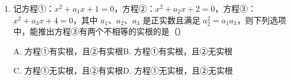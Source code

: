 \documentclass[a4paper,11pt]{article}
\begin{document}
\begin{enumerate}
C. 对 $(a,b,c)$ 的任意值，$a+\dfrac1b$、$b+\dfrac1c$、$c+\dfrac1a$ 都不小于 $2$

D. 对 $(a,b,c)$ 的任意值，$a+\dfrac1b$、$b+\dfrac1c$、$c+\dfrac1a$ 中至多有两个不小于 $2$

\ifanswer
\solbegin
{}
\solend

\fi

\item 记方程①：$x^2+a_1x+1=0$，方程②：$x^2+a_2x+2=0$，方程③：$x^2+a_3x+4=0$，其中 $a_1$、$a_2$、$a_3$ 是正实数且满足 $a_2^2=a_1a_3$，则下列选项中，能推出方程③有两个不相等的实根的是\mbox{（\quad）}

\keepwithprev
A. 方程①有实根，且②有实根\qquad B. 方程①有实根，且②无实根

C. 方程①无实根，且②有实根\qquad D. 方程①无实根，且②无实根

\ifanswer
\solbegin
{}
\solend

\fi

\end{enumerate}

\end{document}
